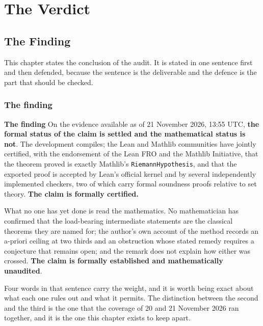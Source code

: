 
\part{The Verdict}
\label{part:verdict}

\chapter{The Finding}
\label{ch:verdict}

This chapter states the conclusion of the audit. It is stated in one sentence
first and then defended, because the sentence is the deliverable and the
defence is the part that should be checked.

\section{The finding}\begin{seamnote}{\textbf{The finding}}
On the evidence available as of 21 November 2026, 13:55 UTC, \textbf{the
formal status of the claim is settled and the mathematical status is not}. The
development compiles; the Lean and Mathlib communities have jointly certified,
with the endorsement of the Lean FRO and the Mathlib Initiative, that the
theorem proved is exactly Mathlib's \texttt{RiemannHypothesis}, and that the
exported proof is accepted by Lean's official kernel and by several
independently implemented checkers, two of which carry formal soundness proofs
relative to set theory. \textbf{The claim is formally certified.}

What no one has yet done is read the mathematics. No mathematician has
confirmed that the load-bearing intermediate statements are the classical
theorems they are named for; the author's own account of the method records an
a-priori ceiling at two thirds and an obstruction whose stated remedy requires
a conjecture that remains open; and the remark does not explain how either was
crossed. \textbf{The claim is formally established and mathematically
unaudited}.
\end{seamnote}

Four words in that sentence carry the weight, and it is worth being exact
about what each one rules out and what it permits. The distinction between
the second and the third is the one that the coverage of 20 and 21 November
2026 ran together, and it is the one this chapter exists to keep apart.

